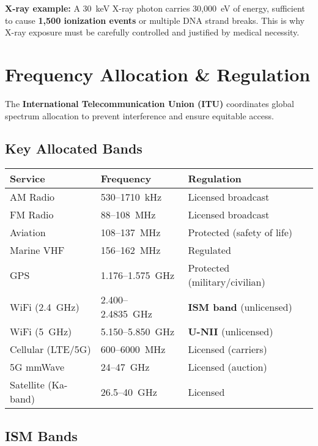 \begin{warningbox}
\textbf{X-ray example:} A 30~keV X-ray photon carries 30,000~eV of energy, sufficient to cause \textbf{1,500 ionization events} or multiple DNA strand breaks. This is why X-ray exposure must be carefully controlled and justified by medical necessity.
\end{warningbox}

\section{Frequency Allocation \& Regulation}

The \textbf{International Telecommunication Union (ITU)} coordinates global spectrum allocation to prevent interference and ensure equitable access.

\subsection{Key Allocated Bands}

\begin{center}
\begin{tabular}{@{}lll@{}}
\toprule
\textbf{Service} & \textbf{Frequency} & \textbf{Regulation} \\
\midrule
AM Radio & 530--1710~kHz & Licensed broadcast \\
FM Radio & 88--108~MHz & Licensed broadcast \\
Aviation & 108--137~MHz & Protected (safety of life) \\
Marine VHF & 156--162~MHz & Regulated \\
GPS & 1.176--1.575~GHz & Protected (military/civilian) \\
WiFi (2.4~GHz) & 2.400--2.4835~GHz & \textbf{ISM band} (unlicensed) \\
WiFi (5~GHz) & 5.150--5.850~GHz & \textbf{U-NII} (unlicensed) \\
Cellular (LTE/5G) & 600--6000~MHz & Licensed (carriers) \\
5G mmWave & 24--47~GHz & Licensed (auction) \\
Satellite (Ka-band) & 26.5--40~GHz & Licensed \\
\bottomrule
\end{tabular}
\end{center}

\subsection{ISM Bands}

